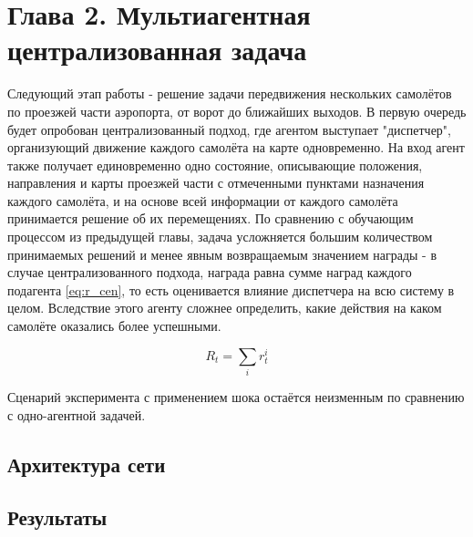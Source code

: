 \section{Глава 2. Мультиагентная централизованная задача}

Следующий этап работы - решение задачи передвижения нескольких самолётов по проезжей части аэропорта,
от ворот до ближайших выходов.
В первую очередь будет опробован централизованный подход, где агентом выступает "диспетчер", 
организующий движение каждого самолёта на карте одновременно.
На вход агент также получает единовременно одно состояние, описывающие положения, направления и карты проезжей части 
с отмеченными пунктами назначения каждого самолёта, и на основе всей информации от каждого самолёта принимается решение об их перемещениях. 
По сравнению с обучающим процессом из предыдущей главы, задача усложняется большим количеством принимаемых решений и менее явным возвращаемым 
значением награды - в случае централизованного подхода, награда равна сумме наград каждого подагента \eqref{eq:r_cen}, то есть оценивается влияние
диспетчера на всю систему в целом. 
Вследствие этого агенту сложнее определить, какие действия на каком самолёте оказались более успешными.

\begin{equation}
\label{eq:r_cen}
R_t = \sum_i r_t^i
\end{equation}

Сценарий эксперимента с применением шока остаётся неизменным по сравнению с одно-агентной задачей.

\subsection{Архитектура сети}

\subsection{Результаты}

